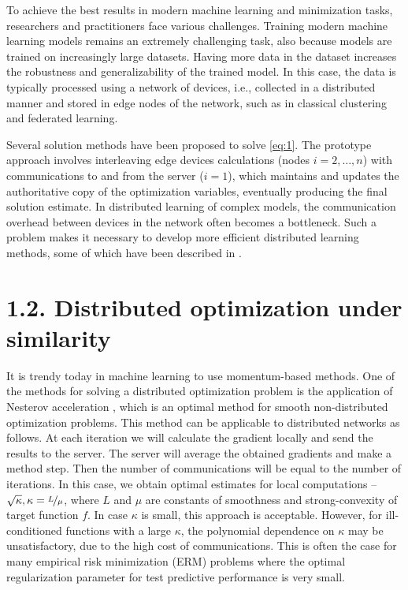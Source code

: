 \documentclass{article}
\theoremstyle{definition}
\theoremstyle{plain}
\begin{document}
To achieve the best results in modern machine learning and minimization tasks, researchers and practitioners face various challenges. Training modern machine learning models remains an extremely challenging task, also because models are trained on increasingly large datasets. Having more data in the dataset increases the robustness and generalizability of the trained model. In this case, the data is typically processed using a network of devices, i.e., collected in a distributed manner and stored in edge nodes of the network, such as in classical clustering \cite{verbraeken2020survey} and federated  \cite{konevcny2016federated, li2020federated, kairouz2021advances} learning.

Several solution methods have been proposed to solve \eqref{eq:1}. The prototype approach involves interleaving edge devices calculations (nodes $i = 2, \ldots, n$) with communications to and from the server ($i = 1$), which maintains and updates the authoritative copy of the optimization variables, eventually producing the final solution estimate. In distributed learning of complex models, the communication overhead between devices in the network often becomes a bottleneck. Such a problem makes it necessary to develop more efficient distributed learning methods, some of which have been described in \cite{konevcny2016federated, ghosh2020communication, smith2018cocoa, gorbunov2021marina}.

\section*{1.2. Distributed optimization under similarity}

It is trendy today in machine learning to use momentum-based methods. One of the methods for solving a distributed optimization problem is the application of Nesterov acceleration \cite{nesterov2018lectures}, which is an optimal method for smooth non-distributed optimization problems. This method can be applicable to distributed networks as follows. At each iteration we will calculate the gradient locally and send the results to the server. The server will average the obtained gradients and make a method step. Then the number of communications will be equal to the number of iterations. In this case, we obtain optimal estimates for local computations -- $\sqrt{\kappa}, \kappa = \nicefrac{L}{\mu}$, where $L$ and $\mu$ are constants of smoothness and strong-convexity of target function $f$. In case $\kappa$ is small, this approach is acceptable. However, for ill-conditioned functions with a large $\kappa$, the polynomial dependence on $\kappa$ may be unsatisfactory, due to the high cost of communications. This is often the case for many empirical risk minimization (ERM) problems where the optimal regularization parameter for test predictive performance is very small.
\end{document}

